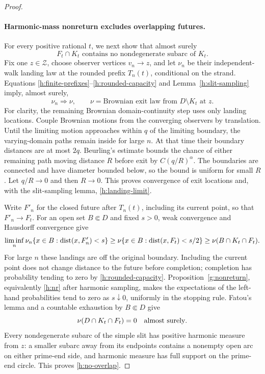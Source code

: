 \begin{proof}
\paragraph{Harmonic-mass nonreturn excludes overlapping futures.}
For every positive rational $t$, we next show that almost surely
\begin{equation}\label{h:no-overlap}
 F_t\cap K_t\text{ contains no nondegenerate subarc of }K_t.
\end{equation}
Fix one $z\in\mathcal Z$, choose observer vertices $v_n\to z$, and let
$\nu_n$ be their independent-walk landing law at the rounded prefix
$T_n(t)$, conditional on the strand. Equations
\eqref{h:finite-prefixes}--\eqref{h:rounded-capacity} and
Lemma~\ref{h:slit-sampling} imply, almost surely,
\begin{equation}\label{h:landing-limit}
 \nu_n\Longrightarrow\nu,
 \qquad\nu=\text{Brownian exit law from }D\setminus K_t\text{ at }z.
\end{equation}
For clarity, the remaining Brownian domain-continuity step uses only
landing locations. Couple Brownian motions from the converging observers
by translation. Until the limiting motion approaches within $q$ of the
limiting boundary, the varying-domain paths remain inside for large
$n$. At that time their boundary distances are at most $2q$.
Beurling's estimate bounds the chance of either remaining path moving
distance $R$ before exit by $C(q/R)^\alpha$. The boundaries are connected
and have diameter bounded below, so the bound is uniform for small
$R$. Let $q/R\to0$ and then $R\to0$. This proves convergence of exit
locations and, with the slit-sampling lemma, \eqref{h:landing-limit}.

Write $F'_n$ for the closed future after $T_n(t)$, including its
current point, so that $F'_n\to F_t$. For an open set $B\Subset D$
and fixed $s>0$, weak convergence and Hausdorff convergence give
\[
 \liminf_n\nu_n\{x\in B:\operatorname{dist}(x,F'_n)<s\}
 \ge\nu\{x\in B:\operatorname{dist}(x,F_t)<s/2\}
 \ge\nu(B\cap K_t\cap F_t).
\]
For large $n$ these landings are off the original boundary. Including
the current point does not change distance to the future before
completion; completion has probability tending to zero by
\eqref{h:rounded-capacity}. Proposition~\ref{g:nonreturn}, equivalently
\eqref{h:nr} after harmonic sampling, makes the expectations of the
left-hand probabilities tend to zero as $s\downarrow0$, uniformly
in the stopping rule. Fatou's lemma and a countable exhaustion by
$B\Subset D$ give
\[
 \nu(D\cap K_t\cap F_t)=0\quad\hbox{almost surely}.
\]
Every nondegenerate subarc of the simple slit has positive harmonic
measure from $z$: a smaller subarc away from its endpoints contains
a nonempty open arc on either prime-end side, and harmonic measure
has full support on the prime-end circle. This proves
\eqref{h:no-overlap}.


\end{proof}
